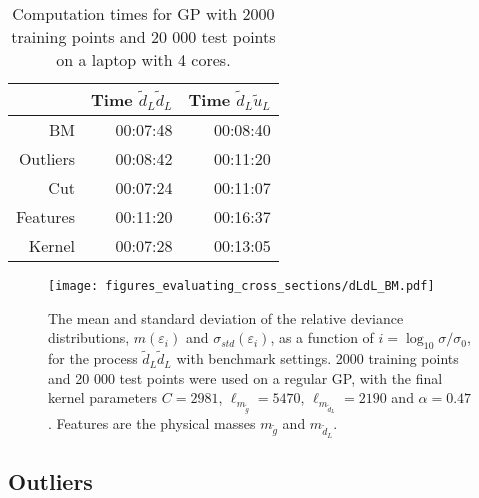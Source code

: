 \documentclass[twoside,english]{uiofysmaster}
\begin{document}
 
\begin{table}
\centering
\begin{tabular}{@{}rrr@{}} \toprule
& Time $\tilde{d}_L \tilde{d}_L$ & Time $\tilde{d}_L \tilde{u}_L$\\
\midrule
BM & 00:07:48 & 00:08:40\\
Outliers & 00:08:42 & 00:11:20\\
Cut & 00:07:24 & 00:11:07\\
Features & 00:11:20 & 00:16:37\\
Kernel & 00:07:28 & 00:13:05\\ \bottomrule
\end{tabular}
\caption{Computation times for GP with 2000 training points and 20 000 test points on a laptop with 4 cores.}
\label{Tab:: evaluating cross : computation times BM}
\end{table}

\begin{figure}
\centering
\texttt{[image: figures\_evaluating\_cross\_sections/dLdL\_BM.pdf]}
\caption{The mean and standard deviation of the relative deviance distributions, $m(\varepsilon_i)$ and $\sigma_{std}(\varepsilon_i)$, as a function of $i = \log_{10} \sigma / \sigma_0$, for the process $\tilde{d}_L \tilde{d}_L$ with benchmark settings. 2000 training points and 20 000 test points were used on a regular GP, with the final kernel parameters $C=2981$, $\ell_{m_{\tilde{g}}}=5470$, $\ell_{m_{\tilde{d}_L}}=2190$ and $\alpha=0.47$. Features are the physical masses $m_{\tilde{g}}$ and $m_{\tilde{d}_L}$.}
\label{Fig:: evaluating cross : BM dLdL error plot}
\end{figure}


\subsection{Outliers}
\end{document}
